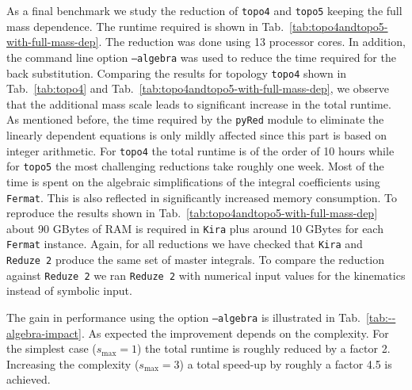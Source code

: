 \documentclass[a4paper,12pt]{scrartcl}
\newcommand*{\kira}{\texttt{Kira}}
\newcommand*{\pyred}{\texttt{pyRed}}
\newcommand*{\reduzetwo}{\texttt{Reduze\,2}}
\newcommand*{\fermat}{\texttt{Fermat}}
\def\Tab#1{{Tab.~\ref{#1}}}
\begin{document}
As a final benchmark we study the reduction of \texttt{topo4} and
\texttt{topo5} keeping the full mass dependence. The runtime required
is shown in \Tab{tab:topo4andtopo5-with-full-mass-dep}. The reduction
was done using 13 processor cores. In addition, the command line
option \texttt{--algebra} was used to reduce the time required for the
back substitution.  Comparing the results for topology \texttt{topo4} shown in
\Tab{tab:topo4} and \Tab{tab:topo4andtopo5-with-full-mass-dep}, we
observe that the additional mass scale leads to significant increase
in the total runtime. As mentioned before, the time required by
the \pyred{} module to eliminate the linearly dependent equations is only
mildly affected since this part is based on integer arithmetic.  For
\texttt{topo4} the total runtime is of the order of 10 hours while for
\texttt{topo5} the most challenging reductions take roughly one week.
Most of the time is spent on the algebraic simplifications of the
integral coefficients using \fermat{}. This is also reflected in significantly
increased memory consumption. To reproduce the results shown in
\Tab{tab:topo4andtopo5-with-full-mass-dep} about 90 GBytes of RAM is
required in \kira{} plus around 10 GBytes for each \fermat{} instance.
Again, for all reductions we have checked that \kira{} and \reduzetwo{} produce the
same set of master integrals. To compare the reduction against \reduzetwo{} we ran
\reduzetwo{} with numerical input values for the kinematics instead of symbolic
input.

The gain in performance using the option \texttt{--algebra}
is illustrated in \Tab{tab:--algebra-impact}. As expected the
improvement depends on the complexity. For the simplest case
($s_{\max}=1$) the total runtime is roughly reduced by a factor 2.
Increasing the complexity ($s_{\max}=3$) a total speed-up by roughly a
factor 4.5 is achieved.
\end{document}

